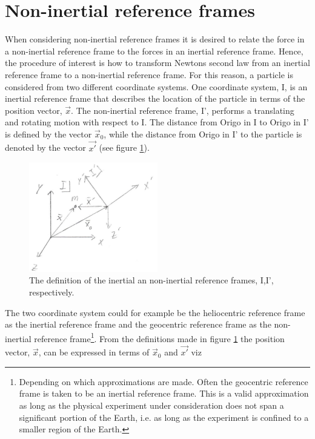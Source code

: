 \section{Non-inertial reference frames}
When considering non-inertial reference frames it is desired to relate the force in a non-inertial reference frame to the forces in an inertial reference frame. Hence, the procedure of interest is how to transform Newtons second law from an inertial reference frame to a non-inertial reference frame. For this reason, a particle is considered from two different coordinate systems. One coordinate system, I, is an inertial reference frame that describes the location of the particle in terms of the position vector, $\vec{x}$. The non-inertial reference frame, I', performs a translating and rotating motion with respect to I. The distance from Origo in I to Origo in I' is defined by the vector $\vec{x}_0$, while the distance from Origo in I' to the particle is denoted by the vector $\vec{x'}$ (see figure \ref{fig:ref}).
\begin{figure}[h]
	\captionsetup{width=1\textwidth}
	\centering
	\includegraphics[width=0.5\textwidth]{figures/ref}
	\caption{The definition of the inertial an non-inertial reference frames, I,I', respectively.}
	\label{fig:ref}
\end{figure}
The two coordinate system could for example be the heliocentric reference frame as the inertial reference frame and the geocentric reference frame as the non-inertial reference frame\footnote{Depending on which approximations are made. Often the geocentric reference frame is taken to be an inertial reference frame. This is a valid approximation as long as the physical experiment under consideration does not span a significant portion of the Earth, i.e. as long as the experiment is confined to a smaller region of the Earth.}. From the definitions made in figure \ref{fig:ref} the position vector, $\vec{x}$, can be expressed in terms of $\vec{x}_0$ and $\vec{x'}$ viz
